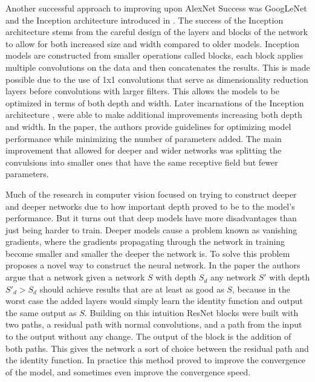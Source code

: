 \documentclass[../main.tex]{subfiles}
\begin{document}
Another successful approach to improving upon AlexNet Success was GoogLeNet and the Inception architecture introduced in \cite{inception}.
The success of the Inception architecture stems from the careful design of the layers and blocks of the network to allow for both increased size and width compared to older models.
Inception models are constructed from smaller operations called blocks, each block applies multiple convolutions on the data and then concatenates the results.
This is made possible due to the use of 1x1 convolutions that serve as dimensionality reduction layers before convolutions with larger filters.
This allows the models to be optimized in terms of both depth and width.
Later incarnations of the Inception architecture \cite{inceptionv2-3}, were able to make additional improvements increasing both depth and width.
In the paper, the authors provide guidelines for optimizing model performance while minimizing the number of parameters added.
The main improvement that allowed for deeper and wider networks was splitting the convulsions into smaller ones that have the same receptive field but fewer parameters.
\par

Much of the research in computer vision focused on trying to construct deeper and deeper networks due to how important depth proved to be to the model's performance.
But it turns out that deep models have more disadvantages than just being harder to train. Deeper models cause a problem known as vanishing gradients,
where the gradients propagating through the network in training become smaller and smaller the deeper the network is.
To solve this problem \cite{resnet} proposes a novel way to construct the neural network. 
In the paper the authors argue that a network given a network $S$ with depth $S_d$ any network $S'$ with depth $S'_d > S_d$ should achieve results that are at least as 
good as $S$, because in the worst case the added layers would simply learn the identity function and output the same output as $S$.
Building on this intuition ResNet blocks were built with two paths, a residual path with normal convolutions, and a path from the input to the output without any change.
The output of the block is the addition of both paths. This gives the network a sort of choice between the residual path and the identity function.
In practice this method proved to improve the convergence of the model, and sometimes even improve the convergence speed.
\par
\end{document}
